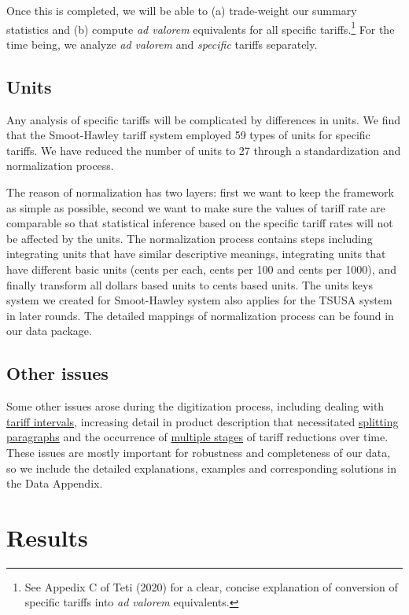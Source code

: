 \documentclass[
  12pt,
]{article}
\begin{document}
Once this is completed, we will be able to (a) trade-weight our summary statistics and (b) compute \emph{ad valorem} equivalents for all specific tariffs.\footnote{See Appedix C of Teti (2020) for a clear, concise explanation of conversion of specific tariffs into \emph{ad valorem} equivalents.} For the time being, we analyze \emph{ad valorem} and \emph{specific} tariffs separately.

\hypertarget{units}{%
\subsection{Units}\label{units}}

Any analysis of specific tariffs will be complicated by differences in units. We find that the Smoot-Hawley tariff system employed 59 types of units for specific tariffs. We have reduced the number of units to 27 through a standardization and normalization process.

The reason of normalization has two layers: first we want to keep the framework as simple as possible, second we want to make sure the values of tariff rate are comparable so that statistical inference based on the specific tariff rates will not be affected by the units. The normalization process contains steps including integrating units that have similar descriptive meanings, integrating units that have different basic units (cents per each, cents per 100 and cents per 1000), and finally transform all dollars based units to cents based units. The units keys system we created for Smoot-Hawley system also applies for the TSUSA system in later rounds. The detailed mappings of normalization process can be found in our data package.

\hypertarget{other-issues}{%
\subsection{Other issues}\label{other-issues}}

Some other issues arose during the digitization process, including dealing with \protect\hyperlink{int}{tariff intervals}, increasing detail in product description that necessitated \protect\hyperlink{split}{splitting paragraphs} and the occurrence of \protect\hyperlink{staging}{multiple stages} of tariff reductions over time. These issues are mostly important for robustness and completeness of our data, so we include the detailed explanations, examples and corresponding solutions in the Data Appendix.

\hypertarget{results}{%
\section{Results}\label{results}}
\end{document}
